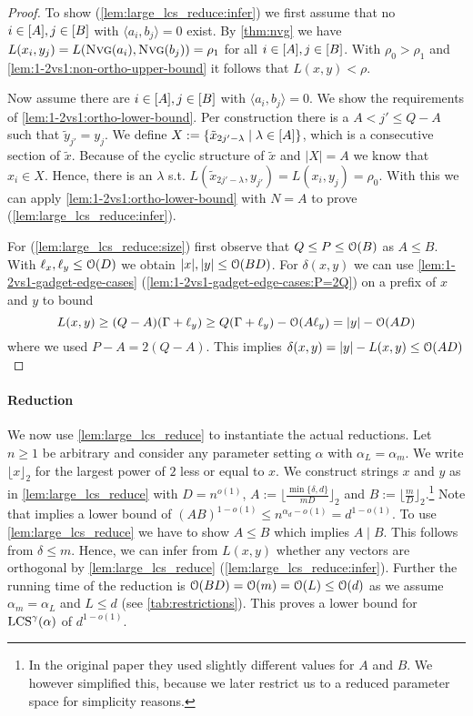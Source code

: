 \begin{proof}
To show (\ref{lem:large_lcs_reduce:infer}) we first assume that no $i \in [A], j \in [B]$ with $\langle a_i, b_j \rangle = 0$ exist.
By \autoref{thm:nvg} we have $L(x_i, y_j) = L(\text{\textsc{Nvg}}(a_i), \text{\textsc{Nvg}}(b_j)) = \rho_1$ for all $i \in [A], j \in [B]$.
With $\rho_0 > \rho_1$ and \autoref{lem:1-2vs1:non-ortho-upper-bound} it follows that $L(x,y) < \rho$.

Now assume there are $i \in [A], j \in [B]$ with $\langle a_i, b_j \rangle = 0$.
We show the requirements of \autoref{lem:1-2vs1:ortho-lower-bound}.
Per construction there is a $A < j' \leq Q - A$ such that $\tilde{y}_{j'} = y_j$.
We define $X := \{\tilde{x}_{2j' - \lambda} \mid \lambda \in [A]\}$, which is a consecutive section of $\tilde{x}$.
Because of the cyclic structure of $\tilde{x}$ and $|X| = A$ we know that $x_i \in X$.
Hence, there is an $\lambda$ s.t. $L(\tilde{x}_{2j' - \lambda}, y_{j'}) = L(x_i, y_j) = \rho_0$.
With this we can apply \autoref{lem:1-2vs1:ortho-lower-bound} with $N = A$ to prove (\ref{lem:large_lcs_reduce:infer}).

For (\ref{lem:large_lcs_reduce:size}) first observe that $Q \leq P \leq \mathcal{O}(B)$ as $A \leq B$. With $\ell_x, \ell_y \leq \mathcal{O}(D)$ we obtain $|x|,|y| \leq \mathcal{O}(BD)$.
For $\delta(x,y)$ we can use \autoref{lem:1-2vs1-gadget-edge-cases} (\ref{lem:1-2vs1-gadget-edge-cases:P=2Q}) on a prefix of $x$ and $y$ to bound
\[
L(x,y) \geq (Q-A)(\Gamma + \ell_y) \geq Q(\Gamma + \ell_y) - \mathcal{O}(A\ell_y) = |y| - \mathcal{O}(AD)
\]
where we used $P - A = 2(Q-A)$. This implies $\delta(x,y) = |y| - L(x,y) \leq \mathcal{O}(AD)$
\end{proof}



\paragraph*{Reduction}
We now use \autoref{lem:large_lcs_reduce} to instantiate the actual reductions. %
Let $n \geq 1$ be arbitrary and consider any parameter setting $\alpha$ with $\alpha_L = \alpha_m$.
We write $\lfloor x \rfloor_2$ for the largest power of $2$ less or equal to $x$.
We construct strings $x$ and $y$ as in \autoref{lem:large_lcs_reduce} with $D = n^{o(1)}$, $A := \lfloor \frac{\min\{\delta, d\}}{mD} \rfloor_2$ and $B := \lfloor \frac{m}{D} \rfloor_2$.\footnote{In the original paper they used slightly different values for $A$ and $B$. We however simplified this, because we later restrict us to a reduced parameter space for simplicity reasons.}
Note that \uovh{} implies a lower bound of $(AB)^{1-o(1)} \leq n^{\alpha_d - o(1)} = d^{1 - o(1)}$.
To use \autoref{lem:large_lcs_reduce} we have to show $A \leq B$ which implies $A \mid B$.
This follows from $\delta \leq m$.
Hence, we can infer from $L(x,y)$ whether any vectors are orthogonal by \autoref{lem:large_lcs_reduce} (\ref{lem:large_lcs_reduce:infer}).
Further the running time of the reduction is $\mathcal{O}(BD) = \mathcal{O}(m) = \mathcal{O}(L) \leq \mathcal{O}(d)$ as we assume $\alpha_m = \alpha_L$ and $L \leq d$ (see \autoref{tab:restrictions}).
This proves a lower bound for $\text{LCS}^\gamma(\mathbb{\alpha})$ of $d^{1-o(1)}$.


